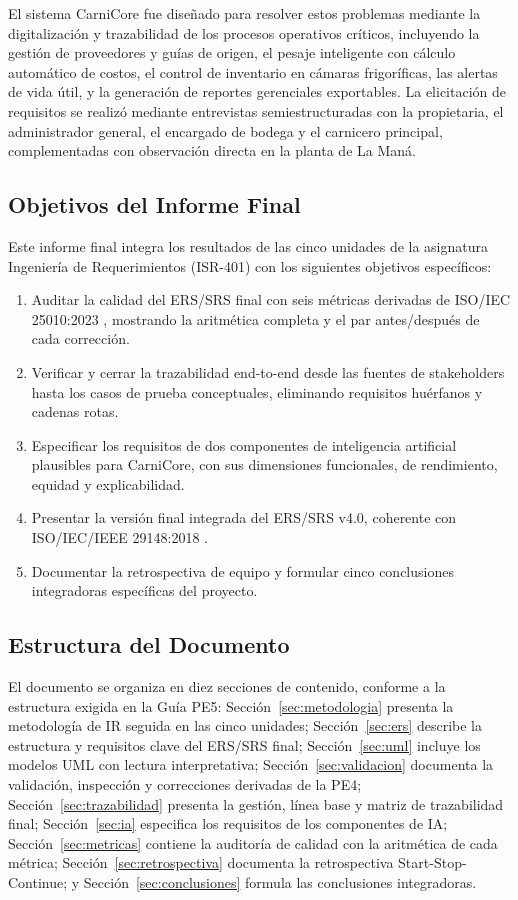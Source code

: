 \documentclass[11pt,a4paper]{article}
\begin{document}
El sistema CarniCore fue diseñado para resolver estos problemas mediante la digitalización y trazabilidad de los procesos operativos críticos, incluyendo la gestión de proveedores y guías de origen, el pesaje inteligente con cálculo automático de costos, el control de inventario en cámaras frigoríficas, las alertas de vida útil, y la generación de reportes gerenciales exportables. La elicitación de requisitos se realizó mediante entrevistas semiestructuradas con la propietaria, el administrador general, el encargado de bodega y el carnicero principal, complementadas con observación directa en la planta de La Maná.

\subsection{Objetivos del Informe Final}

Este informe final integra los resultados de las cinco unidades de la asignatura Ingeniería de Requerimientos (ISR-401) con los siguientes objetivos específicos:

\begin{enumerate}
  \item Auditar la calidad del ERS/SRS final con seis métricas derivadas de ISO/IEC 25010:2023 \cite{iso25010}, mostrando la aritmética completa y el par antes/después de cada corrección.
  \item Verificar y cerrar la trazabilidad end-to-end desde las fuentes de stakeholders hasta los casos de prueba conceptuales, eliminando requisitos huérfanos y cadenas rotas.
  \item Especificar los requisitos de dos componentes de inteligencia artificial plausibles para CarniCore, con sus dimensiones funcionales, de rendimiento, equidad y explicabilidad.
  \item Presentar la versión final integrada del ERS/SRS v4.0, coherente con ISO/IEC/IEEE 29148:2018 \cite{iso29148}.
  \item Documentar la retrospectiva de equipo y formular cinco conclusiones integradoras específicas del proyecto.
\end{enumerate}

\subsection{Estructura del Documento}

El documento se organiza en diez secciones de contenido, conforme a la estructura exigida en la Guía PE5: Sección~\ref{sec:metodologia} presenta la metodología de IR seguida en las cinco unidades; Sección~\ref{sec:ers} describe la estructura y requisitos clave del ERS/SRS final; Sección~\ref{sec:uml} incluye los modelos UML con lectura interpretativa; Sección~\ref{sec:validacion} documenta la validación, inspección y correcciones derivadas de la PE4; Sección~\ref{sec:trazabilidad} presenta la gestión, línea base y matriz de trazabilidad final; Sección~\ref{sec:ia} especifica los requisitos de los componentes de IA; Sección~\ref{sec:metricas} contiene la auditoría de calidad con la aritmética de cada métrica; Sección~\ref{sec:retrospectiva} documenta la retrospectiva Start-Stop-Continue; y Sección~\ref{sec:conclusiones} formula las conclusiones integradoras.
\end{document}
